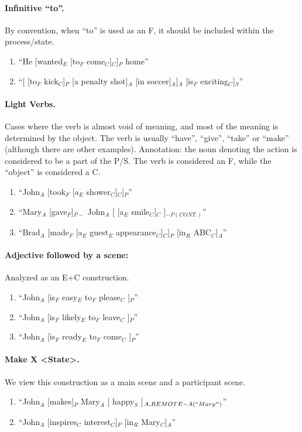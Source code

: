 \documentclass[11pt]{article}
\newcommand{\be}{\begin{enumerate}}
\newcommand{\ee}{\end{enumerate}}
\begin{document}
\paragraph{
Infinitive ``to''.} By convention, when ``to'' is used as an F, it should be included within the process/state.
\be \item
``He [wanted$_E$ [to$_F$ come$_C$]$_C$]$_P$ home''
\item
``[ [to$_F$ kick$_C$]$_P$ [a penalty shot]$_A$ [in soccer]$_A$]$_A$ [is$_F$ exciting$_C$]$_S$''
\ee

\paragraph{
Light Verbs.} Cases where the verb is almost void of meaning, and most of the meaning is determined by the object. The verb is usually ``have'', ``give'', ``take'' or ``make'' (although there are other examples). Annotation: the noun denoting the action is considered to be a part of the P/S. The verb is considered an F, while the ``object'' is considered a C.
\be \item
``John$_A$ [took$_F$ [a$_E$ shower$_C$]$_C$]$_P$''
\item
``Mary$_A$ [gave$_F$]$_{P-}$ John$_A$ [ [a$_E$ smile$_C$]$_C$ ]$_{-P(CONT.)}$''
\item
``Brad$_A$ [made$_F$ [a$_E$ guest$_E$ appearance$_C$]$_C$]$_P$ [in$_R$ ABC$_C$]$_A$''
\ee

\paragraph{
Adjective followed by a scene:} Analyzed as an E+C construction.
\be \item
``John$_A$ [is$_F$ easy$_E$ to$_F$ please$_C$ ]$_P$''
\item
``John$_A$ [is$_F$ likely$_E$ to$_F$ leave$_C$ ]$_P$''
\item
``John$_A$ [is$_F$ ready$_E$ to$_F$ come$_C$ ]$_P$''
\ee

\paragraph{
Make X  \textless State\textgreater.} We view this construction as a main scene and a participant scene.
\be \item
``John$_A$ [makes]$_P$ Mary$_A$ [ happy$_S$ ]$_{A, REMOTE-A(``Mary'')}$''
\item
``John$_A$ [inspires$_C$ interest$_C$]$_P$ [in$_R$ Mary$_C$]$_A$''
\ee
\end{document}
